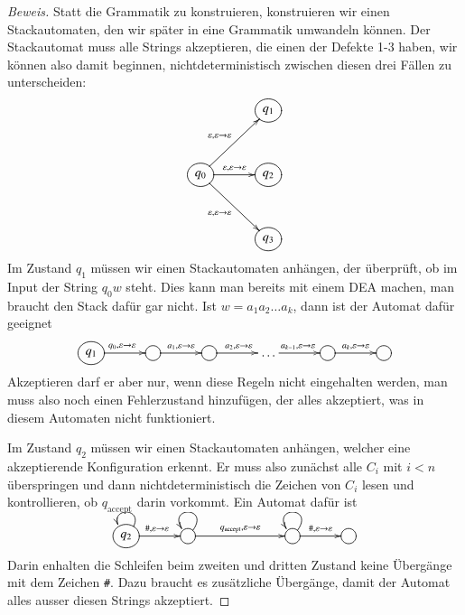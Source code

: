 \begin{proof}[Beweis]
Statt die Grammatik zu konstruieren, konstruieren wir einen Stackautomaten,
den wir später in eine Grammatik umwandeln können.
Der Stackautomat
muss alle Strings akzeptieren, die einen der Defekte 1-3 haben, wir
können also damit beginnen, nichtdeterministisch zwischen diesen drei
Fällen zu unterscheiden:
\[
\entrymodifiers={++[o][F]}
\xymatrix @+3mm{
*+\txt{}
	&q_1
\\
q_0	\ar[ur]^{\varepsilon,\varepsilon\to\varepsilon}
	\ar[r]^{\varepsilon,\varepsilon\to\varepsilon}
	\ar[dr]_{\varepsilon,\varepsilon\to\varepsilon}
	&q_2
\\
*+\txt{}
	&q_3
}
\]
Im Zustand $q_1$ müssen wir einen Stackautomaten anhängen, der
überprüft, ob im Input der String $q_0w$ steht.
Dies kann man 
bereits mit einem DEA machen, man braucht den Stack dafür gar nicht.
Ist $w=a_1a_2\dots a_k$, dann ist der Automat dafür geeignet
\[
\xymatrix @+3mm{
*++[o][F]{q_1}\ar[r]^{q_0,\varepsilon\to\varepsilon}
	&*++[o][F]{}\ar[r]^{a_1,\varepsilon\to\varepsilon}
		&*++[o][F]{}\ar[r]^{a_2,\varepsilon\to\varepsilon}
			&\dots\ar[r]^{a_{k-1},\varepsilon\to\varepsilon}
				&*++[o][F]{}\ar[r]^{a_k,\varepsilon\to\varepsilon}
					&*++[o][F]{}
}
\]
Akzeptieren darf er aber nur, wenn diese Regeln nicht eingehalten
werden, man muss also noch einen Fehlerzustand hinzufügen, der
alles akzeptiert, was in diesem Automaten nicht funktioniert.

Im Zustand $q_2$ müssen wir einen Stackautomaten anhängen, welcher
eine akzeptierende Konfiguration erkennt.
Er muss also zunächst 
alle $C_i$ mit $i<n$ überspringen und dann nichtdeterministisch
die Zeichen von $C_i$ lesen und kontrollieren, ob $q_{\text{accept}}$
darin vorkommt.
Ein Automat dafür ist 
\[
\entrymodifiers={++[o][F]}
\xymatrix @+3mm{
q_2\ar@(ur,ul)
	\ar[r]^{{\tt\#},\varepsilon\to\varepsilon}
	&{}\ar@(ur,ul)
		\ar[rr]^{q_{\text{accept}},\varepsilon\to\varepsilon}
		&*+\txt{}
			&{}\ar@(ur,ul)
				\ar[r]^{{\tt\#},\varepsilon\to\varepsilon}
				&*++[o][F]{}
}
\]
Darin enhalten die Schleifen beim zweiten und dritten Zustand keine
Übergänge mit dem Zeichen {\tt\#}.
Dazu braucht es zusätzliche
Übergänge, damit der Automat alles ausser diesen Strings akzeptiert.


\end{proof}
